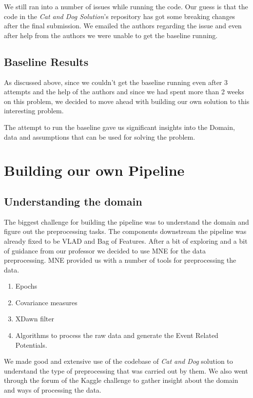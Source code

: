 \documentclass[final,leqno,onefignum,onetabnum]{siamltexmm}
\begin{document}
We still ran into a number of issues while running the code.  Our guess is that the code in the \textit{Cat and Dog Solution}'s repository has got some breaking changes after the final submission.  We emailed the authors regarding the issue and even after help from the authors we were unable to get the baseline running.

\subsection{Baseline Results}
As discussed above, since we couldn't get the baseline running even after 3 attempts and the help of the authors and since we had spent more than 2 weeks on this problem, we decided to move ahead with building our own solution to this interesting problem.


The attempt to run the baseline gave us significant insights into the Domain, data and assumptions that can be used for solving the problem.

\section{Building our own Pipeline}

\subsection{Understanding the domain}
The biggest challenge for building the pipeline was to understand the domain and figure out the preprocessing tasks.  
The components downstream the pipeline was already fixed to be VLAD\cite{art:vlad_aggregate_paper}\cite{art:all_about_vlad}  and Bag of Features.
After a bit of exploring and a bit of guidance from our professor we decided to use MNE\cite{website:mne_python} for the data preprocessing.  MNE provided us with a number of tools for preprocessing the data.
\begin{enumerate}
  \item Epochs
  \item Covariance measures
  \item XDawn filter\cite{art:Xdawn_filter}
  \item Algorithms to process the raw data and generate the Event Related Potentials.
\end{enumerate}
We made good and extensive use of the codebase of \textit{Cat and Dog} solution to understand the type of preprocessing that was carried out by them.  
We also went through the forum of the Kaggle challenge to gather insight about the domain and ways of processing the data.
\end{document}
